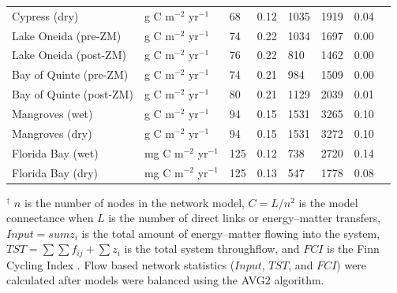 \documentclass[article]{jss}
\begin{document}
\begin{table}[ht]
\begin{center}
\begin{tiny}
\begin{tabularx}{\textwidth}{llllllll}
      Cypress (dry) & g C m$^{-2}$ yr$^{-1}$  &  68 & 0.12 & 1035 & 1919 & 0.04 &  \citet{ulanowicz97_cypress} \\
      Lake Oneida (pre-ZM) & g C m$^{-2}$ yr$^{-1}$  &  74 & 0.22 & 1034 & 1697 & 0.00 &  \citet{miehls09_oneida} \\
      Lake Oneida (post-ZM) & g C m$^{-2}$ yr$^{-1}$  &  76 & 0.22 & 810 & 1462 & 0.00 &  \citet{miehls09_oneida} \\
      Bay of Quinte (pre-ZM) & g C m$^{-2}$ yr$^{-1}$  &  74 & 0.21 & 984 & 1509 & 0.00 &   \citet{miehls09_quinte} \\
      Bay of Quinte (post-ZM) & g C m$^{-2}$ yr$^{-1}$  &  80 & 0.21 & 1129 & 2039 & 0.01 &   \citet{miehls09_quinte} \\
      Mangroves (wet) & g C m$^{-2}$ yr$^{-1}$  &  94 & 0.15 & 1531 & 3265 & 0.10 &  \citet{ulanowicz99_mangrove} \\
      Mangroves (dry) & g C m$^{-2}$ yr$^{-1}$  &  94 & 0.15 & 1531 & 3272 & 0.10 &  \citet{ulanowicz99_mangrove} \\
      Florida Bay (wet) & mg C m$^{-2}$ yr$^{-1}$  & 125 & 0.12 & 738 & 2720 & 0.14 &  \citet{ulanowicz98_fb} \\
      Florida Bay (dry) & mg C m$^{-2}$ yr$^{-1}$  & 125 & 0.13 & 547 & 1778 & 0.08 &  \citet{ulanowicz98_fb} \\
      \hline
\end{tabularx}
\end{tiny}
\end{center}
\begin{scriptsize}
  $^\dagger$ $n$ is the number of nodes in the network model,
  $C=L/n^2$ is the model connectance when $L$ is the number of direct
  links or energy--matter transfers, $Input =sum{z_i}$ is the total
  amount of energy--matter flowing into the system,
  $TST=\sum\sum{f_{ij}}+\sum{z_i}$ is the total system throughflow,
  and $FCI$ is the Finn Cycling Index \citep{finn80}. Flow based
  network statistics ($Input$, $TST$, and $FCI$) were calculated after
  models were balanced using the AVG2 algorithm.
\end{scriptsize}
\end{table}
\end{document}
